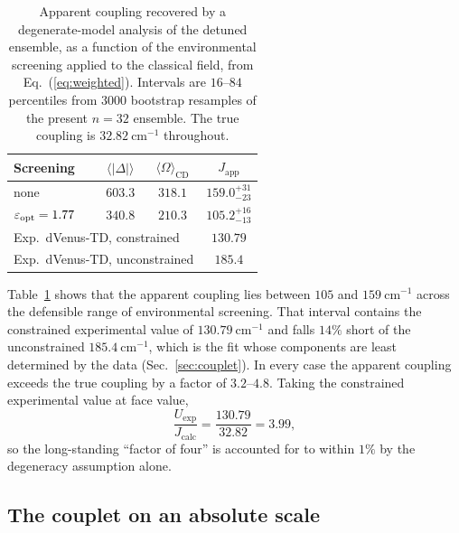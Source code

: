 \documentclass[journal=jpcbfk, manuscript=article, layout=twocolumn, doi=true]{achemso}
\begin{document}
\begin{table}[t]
\centering
\caption{Apparent coupling recovered by a degenerate-model analysis of the
detuned ensemble, as a function of the environmental screening applied to the
classical field, from Eq.~(\ref{eq:weighted}). Intervals are $16$--$84$
percentiles from $3000$ bootstrap resamples of the present $n=32$ ensemble.
The true coupling is $32.82~\mathrm{cm^{-1}}$ throughout.}
\label{tab:apparent}
\begin{tabular}{lccc}
\toprule
Screening & $\langle|\Delta|\rangle$ & $\langle\Omega\rangle_{\mathrm{CD}}$ & $J_{\mathrm{app}}$ \\
\midrule
none                           & $603.3$ & $318.1$ & $159.0^{+31}_{-23}$ \\
$\varepsilon_{\rm opt} = 1.77$ & $340.8$ & $210.3$ & $105.2^{+16}_{-13}$ \\
\midrule
\multicolumn{3}{l}{Exp.\ dVenus-TD, constrained} & $130.79$ \\
\multicolumn{3}{l}{Exp.\ dVenus-TD, unconstrained} & $185.4$ \\
\bottomrule
\end{tabular}
\end{table}

Table~\ref{tab:apparent} shows that the apparent coupling lies between $105$ and
$159~\mathrm{cm^{-1}}$ across the defensible range of environmental screening.
That interval contains the constrained experimental value of
$130.79~\mathrm{cm^{-1}}$ and falls $14\%$ short of the unconstrained
$185.4~\mathrm{cm^{-1}}$, which is the fit whose components are least
determined by the data (Sec.~\ref{sec:couplet}). In every case the apparent
coupling exceeds the true coupling by a factor of $3.2$--$4.8$. Taking the constrained
experimental value at face value,
\begin{equation}
\frac{U_{\mathrm{exp}}}{J_{\mathrm{calc}}}
= \frac{130.79}{32.82} = 3.99 ,
\end{equation}
so the long-standing ``factor of four'' is accounted for to within $1\%$ by the
degeneracy assumption alone.

\subsection{The couplet on an absolute scale}
\label{sec:absolute}
\end{document}

